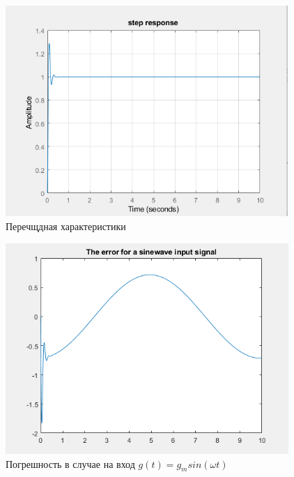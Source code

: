 \documentclass[a4paper,12pt]{article}
\begin{document}
\begin{figure}[h]
    \centering
    \includegraphics[height=8cm]{img/f4.PNG}
    \caption{Перечщдная характеристики}
    \label{fig:my_label}
\end{figure}

\begin{figure}[h]
    \centering
    \includegraphics[height=8cm]{img/f5.PNG}
    \caption{Погрешность в случае на вход $g(t)=g_m sin(\omega t)$}
    \label{fig:my_label}
\end{figure}
\end{document}
